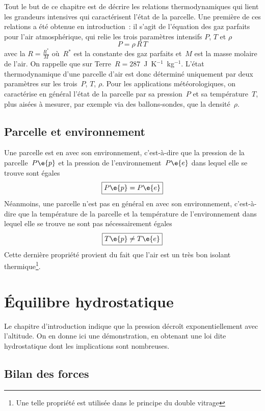 \sk
Tout le but de ce chapitre est de décrire les relations thermodynamiques qui lient les grandeurs intensives qui caractérisent l'état de la parcelle. Une première de ces relations a été obtenue en introduction~: il s'agit de l'équation des gaz parfaits pour l'air atmosphérique, qui relie les trois paramètres intensifs $P$, $T$ et $\rho$ 
\[ \boxed{ P = \rho \, R \,T } \] 
avec la  $R=\frac{R^*}{M}$ où~$R^*$ est la constante des gaz parfaits et~$M$ est la masse molaire de l'air. On rappelle que sur Terre~$R = 287$~J~K$^{-1}$~kg$^{-1}$. L'état thermodynamique d'une parcelle d'air est donc déterminé uniquement par deux paramètres sur les trois~$P$, $T$, $\rho$. Pour les applications météorologiques, on caractérise en général l'état de la parcelle par sa pression~$P$ et sa température~$T$, plus aisées à mesurer, par exemple via des ballons-sondes, que la densité~$\rho$.

\sk
\subsection{Parcelle et environnement} \label{parcenv}

\sk
Une parcelle est en  avec son environnement, c'est-à-dire que la pression de la parcelle~$P\e{p}$ et la pression de l'environnement~$P\e{e}$ dans lequel elle se trouve sont égales
\[ \boxed{P\e{p} = P\e{e}} \]
Néanmoins, une parcelle n'est pas en général en  avec son environnement, c'est-à-dire que la température de la parcelle et la température de l'environnement dans lequel elle se trouve ne sont pas nécessairement égales
\[ \boxed{T\e{p} \neq T\e{e}} \]
Cette dernière propriété provient du fait que l'air est un très bon isolant thermique\footnote{Une telle propriété est utilisée dans le principe du double vitrage}.

\mk
\section{Équilibre hydrostatique}

\sk
Le chapitre d'introduction indique que la pression décroît exponentiellement avec l'altitude. On en donne ici une démonstration, en obtenant une loi dite hydrostatique dont les implications sont nombreuses. 

\sk
\subsection{Bilan des forces}

